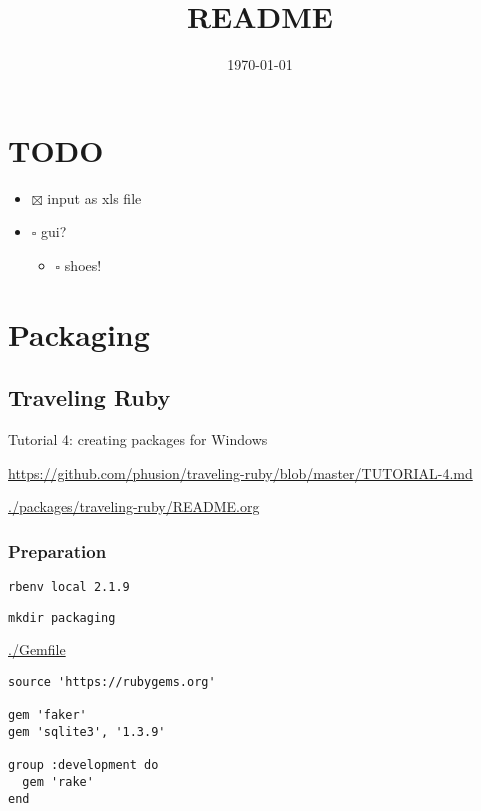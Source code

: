 \documentclass[11pt]{article}
\date{\today}
\title{README}
\begin{document}
\maketitle
\tableofcontents

\section{{\bfseries\sffamily TODO} }
\label{sec-1}

\begin{itemize}
\item $\boxtimes$ input as xls file
\item $\square$ gui?
\begin{itemize}
\item $\square$ shoes!
\end{itemize}
\end{itemize}


\section{Packaging}
\label{sec-2}

\subsection{Traveling Ruby}
\label{sec-2-1}

Tutorial 4: creating packages for Windows

\url{https://github.com/phusion/traveling-ruby/blob/master/TUTORIAL-4.md}

\url{./packages/traveling-ruby/README.org}

\subsubsection{Preparation}
\label{sec-2-1-1}

\begin{verbatim}
rbenv local 2.1.9
\end{verbatim}

\begin{verbatim}
mkdir packaging
\end{verbatim}

\url{./Gemfile}

\begin{verbatim}
source 'https://rubygems.org'

gem 'faker'
gem 'sqlite3', '1.3.9'

group :development do
  gem 'rake'
end
\end{verbatim}
\end{document}
